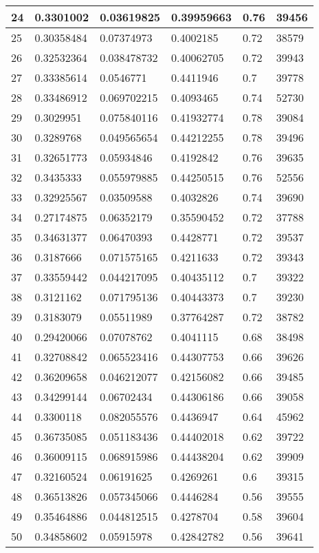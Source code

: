 \begin{longtable}{|l|l|l|l|l|l|}
24 & 0.3301002 & 0.03619825 & 0.39959663 & 0.76 & 39456 \\ \hline 
25 & 0.30358484 & 0.07374973 & 0.4002185 & 0.72 & 38579 \\ \hline 
26 & 0.32532364 & 0.038478732 & 0.40062705 & 0.72 & 39943 \\ \hline 
27 & 0.33385614 & 0.0546771 & 0.4411946 & 0.7 & 39778 \\ \hline 
28 & 0.33486912 & 0.069702215 & 0.4093465 & 0.74 & 52730 \\ \hline 
29 & 0.3029951 & 0.075840116 & 0.41932774 & 0.78 & 39084 \\ \hline 
30 & 0.3289768 & 0.049565654 & 0.44212255 & 0.78 & 39496 \\ \hline 
31 & 0.32651773 & 0.05934846 & 0.4192842 & 0.76 & 39635 \\ \hline 
32 & 0.3435333 & 0.055979885 & 0.44250515 & 0.76 & 52556 \\ \hline 
33 & 0.32925567 & 0.03509588 & 0.4032826 & 0.74 & 39690 \\ \hline 
34 & 0.27174875 & 0.06352179 & 0.35590452 & 0.72 & 37788 \\ \hline 
35 & 0.34631377 & 0.06470393 & 0.4428771 & 0.72 & 39537 \\ \hline 
36 & 0.3187666 & 0.071575165 & 0.4211633 & 0.72 & 39343 \\ \hline 
37 & 0.33559442 & 0.044217095 & 0.40435112 & 0.7 & 39322 \\ \hline 
38 & 0.3121162 & 0.071795136 & 0.40443373 & 0.7 & 39230 \\ \hline 
39 & 0.3183079 & 0.05511989 & 0.37764287 & 0.72 & 38782 \\ \hline 
40 & 0.29420066 & 0.07078762 & 0.4041115 & 0.68 & 38498 \\ \hline 
41 & 0.32708842 & 0.065523416 & 0.44307753 & 0.66 & 39626 \\ \hline 
42 & 0.36209658 & 0.046212077 & 0.42156082 & 0.66 & 39485 \\ \hline 
43 & 0.34299144 & 0.06702434 & 0.44306186 & 0.66 & 39058 \\ \hline 
44 & 0.3300118 & 0.082055576 & 0.4436947 & 0.64 & 45962 \\ \hline 
45 & 0.36735085 & 0.051183436 & 0.44402018 & 0.62 & 39722 \\ \hline 
46 & 0.36009115 & 0.068915986 & 0.44438204 & 0.62 & 39909 \\ \hline 
47 & 0.32160524 & 0.06191625 & 0.4269261 & 0.6 & 39315 \\ \hline 
48 & 0.36513826 & 0.057345066 & 0.4446284 & 0.56 & 39555 \\ \hline 
49 & 0.35464886 & 0.044812515 & 0.4278704 & 0.58 & 39604 \\ \hline 
50 & 0.34858602 & 0.05915978 & 0.42842782 & 0.56 & 39641 \\ \hline 
\end{longtable}
